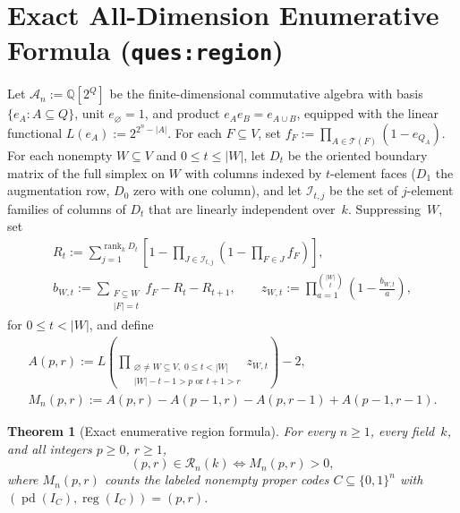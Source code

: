 \documentclass[11pt]{article}
\theoremstyle{plain}
\newtheorem{theorem}{Theorem}
\theoremstyle{definition}
\theoremstyle{remark}
\DeclareMathOperator{\pd}{pd}
\DeclareMathOperator{\reg}{reg}
\DeclareMathOperator{\rank}{rank}
\begin{document}
\section{Exact All-Dimension Enumerative Formula (\texttt{ques:region})}

Let $\mathcal{A}_n := \mathbb{Q}[2^Q]$ be the finite-dimensional commutative algebra with basis $\{e_A : A \subseteq Q\}$, unit $e_\varnothing = 1$, and product $e_A e_B = e_{A\cup B}$, equipped with the linear functional $L(e_A) := 2^{2^n - |A|}$. For each $F \subseteq V$, set $f_F := \prod_{A \in \mathcal{T}(F)} (1 - e_{Q_A})$. For each nonempty $W \subseteq V$ and $0 \le t \le |W|$, let $D_t$ be the oriented boundary matrix of the full simplex on $W$ with columns indexed by $t$-element faces ($D_1$ the augmentation row, $D_0$ zero with one column), and let $\mathcal{I}_{t,j}$ be the set of $j$-element families of columns of $D_t$ that are linearly independent over~$k$. Suppressing~$W$, set
\begin{gather*}
R_t := \sum_{j=1}^{\rank_k D_t} \left[1 - \prod_{J \in \mathcal{I}_{t,j}} \left(1 - \prod_{F \in J} f_F\right)\right], \\[0.35em]
b_{W,t} := \sum_{\substack{F \subseteq W \\ |F| = t}} f_F - R_t - R_{t+1},
\qquad
z_{W,t} := \prod_{a=1}^{\binom{|W|}{t}} \left(1 - \frac{b_{W,t}}{a}\right),
\end{gather*}
for $0 \le t < |W|$, and define
\begin{gather*}
A(p,r) := L\!\left(\prod_{\substack{\varnothing \neq W \subseteq V,\; 0 \le t < |W| \\ |W|-t-1 > p \text{ or } t+1 > r}} z_{W,t}\right) - 2, \\[0.35em]
M_n(p,r) := A(p,r) - A(p-1,r) - A(p,r-1) + A(p-1,r-1).
\end{gather*}

\begin{theorem}[Exact enumerative region formula]\label{thm:enum}
For every $n \ge 1$, every field~$k$, and all integers $p \ge 0$, $r \ge 1$,
\begin{equation}\label{eq:enum}
(p,r) \in \mathcal{R}_n(k) \iff M_n(p,r) > 0,
\end{equation}
where $M_n(p,r)$ counts the labeled nonempty proper codes $C \subseteq \{0,1\}^n$ with $(\pd(I_C),\reg(I_C)) = (p,r)$.
\end{theorem}
\end{document}
